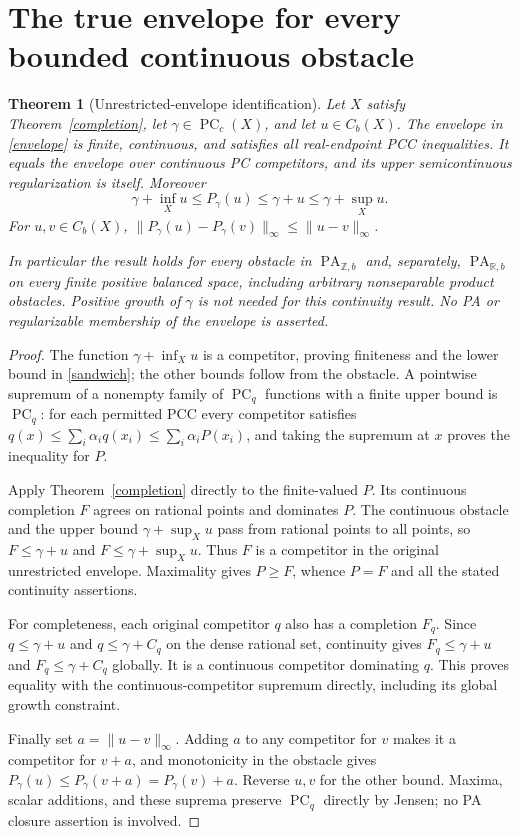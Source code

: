 \documentclass[11pt]{article}
\newtheorem{theorem}{Theorem}
\newcommand{\R}{\mathbb R}
\newcommand{\Z}{\mathbb Z}
\newcommand{\PC}{\operatorname{PC}}
\newcommand{\PA}{\operatorname{PA}}
\begin{document}
\section{The true envelope for every bounded continuous obstacle}
\begin{theorem}[Unrestricted-envelope identification]\label{true-envelope}
Let $X$ satisfy Theorem~\ref{completion}, let $\gamma\in\PC_c(X)$, and let $u\in C_b(X)$. The envelope in \eqref{envelope} is finite, continuous, and satisfies all real-endpoint PCC inequalities. It equals the envelope over continuous PC competitors, and its upper semicontinuous regularization is itself. Moreover
\begin{equation}\label{sandwich}
 \gamma+\inf_Xu\leq P_\gamma(u)\leq\gamma+u\leq\gamma+\sup_Xu.
\end{equation}
For $u,v\in C_b(X)$, $\|P_\gamma(u)-P_\gamma(v)\|_\infty\leq\|u-v\|_\infty$.

In particular the result holds for every obstacle in $\PA_{\Z,b}$ and, separately, $\PA_{\R,b}$ on every finite positive balanced space, including arbitrary nonseparable product obstacles. Positive growth of $\gamma$ is not needed for this continuity result. No PA or regularizable membership of the envelope is asserted.
\end{theorem}
\begin{proof}
The function $\gamma+\inf_Xu$ is a competitor, proving finiteness and the lower bound in \eqref{sandwich}; the other bounds follow from the obstacle. A pointwise supremum of a nonempty family of $\PC_q$ functions with a finite upper bound is $\PC_q$: for each permitted PCC every competitor satisfies $q(x)\leq\sum_i\alpha_i q(x_i)\leq\sum_i\alpha_i P(x_i)$, and taking the supremum at $x$ proves the inequality for $P$.

Apply Theorem~\ref{completion} directly to the finite-valued $P$. Its continuous completion $F$ agrees on rational points and dominates $P$. The continuous obstacle and the upper bound $\gamma+\sup_Xu$ pass from rational points to all points, so $F\leq\gamma+u$ and $F\leq\gamma+\sup_Xu$. Thus $F$ is a competitor in the original unrestricted envelope. Maximality gives $P\geq F$, whence $P=F$ and all the stated continuity assertions.

For completeness, each original competitor $q$ also has a completion $F_q$. Since $q\leq\gamma+u$ and $q\leq\gamma+C_q$ on the dense rational set, continuity gives $F_q\leq\gamma+u$ and $F_q\leq\gamma+C_q$ globally. It is a continuous competitor dominating $q$. This proves equality with the continuous-competitor supremum directly, including its global growth constraint.

Finally set $a=\|u-v\|_\infty$. Adding $a$ to any competitor for $v$ makes it a competitor for $v+a$, and monotonicity in the obstacle gives $P_\gamma(u)\leq P_\gamma(v+a)=P_\gamma(v)+a$. Reverse $u,v$ for the other bound. Maxima, scalar additions, and these suprema preserve $\PC_q$ directly by Jensen; no PA closure assertion is involved.
\end{proof}
\end{document}
